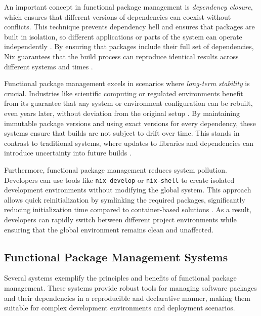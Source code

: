 An important concept in functional package management is \textit{dependency closure},
which ensures that different versions of dependencies can coexist without conflicts.
This technique prevents dependency hell and ensures that packages are built in isolation,
so different applications or parts of the system can operate independently
\cite[Chapter 3.3]{dolstraPurelyFunctionalSoftware2006}. By ensuring that packages
include their full set of dependencies, Nix guarantees that the build process can
reproduce identical results across different systems and times
\cite[Section 2.1]{courtesFunctionalPackageManagement2013}.

Functional package management excels in scenarios where \textit{long-term stability}
is crucial. Industries like scientific computing or regulated environments benefit
from its guarantee that any system or environment configuration can be rebuilt,
even years later, without deviation from the original setup
\cite[Section 2, Page 5]{rahmanWorksMeCannot2022}. By maintaining immutable
package versions and using exact versions for every dependency, these systems ensure
that builds are not subject to drift over time. This stands in contrast to traditional
systems, where updates to libraries and dependencies can introduce uncertainty into
future builds \cite[Chapter 5.2]{dolstraPurelyFunctionalSoftware2006}.

Furthermore, functional package management reduces system pollution. Developers can
use tools like \texttt{nix develop} or \texttt{nix-shell} to create isolated development
environments without modifying the global system. This approach allows quick
reinitialization by symlinking the required packages, significantly reducing
initialization time compared to container-based solutions
\cite{NixDevelopNix, NixshellNixReference}. As a result, developers can rapidly
switch between different project environments while ensuring that the global
environment remains clean and unaffected.

\subsection{Functional Package Management Systems}

Several systems exemplify the principles and benefits of functional package management.
These systems provide robust tools for managing software packages and their dependencies
in a reproducible and declarative manner, making them suitable for complex development
environments and deployment scenarios.


